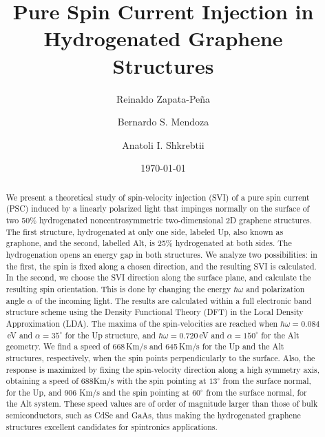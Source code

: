 \documentclass[floatfix,prb,aps,superscriptaddress,showpacs,11pt,preprint,letterpaper]{revtex4}
\begin{document}
\title{Pure Spin Current Injection in Hydrogenated Graphene Structures}
\author{Reinaldo Zapata-Pe\~na}
\author{Bernardo S. Mendoza}
\author{Anatoli I. Shkrebtii}

\date{\today}

\begin{abstract}
We present a theoretical study of spin-velocity injection (SVI) of a pure spin
current (PSC) induced by  a linearly polarized light that impinges normally on
the surface of  two 50\% hydrogenated noncentrosymmetric two-dimensional 2D
graphene structures. The first structure, hydrogenated at only one side,
labeled Up, also known as graphone, and the second, labelled Alt, is
25\% hydrogenated at both sides. The hydrogenation opens an energy gap in both
structures. We analyze two possibilities: in the first, the spin is fixed
along a chosen direction, and the resulting SVI is calculated.
In the second, we choose the SVI direction along
the surface plane, and calculate the resulting
spin orientation. This is done by changing the energy
$\hbar\omega$ and polarization angle $\alpha$  of the incoming  light. The
results are calculated within a full electronic band structure scheme using the
Density Functional Theory (DFT) in the Local Density Approximation (LDA). The
maxima of the spin-velocities are reached when $\hbar\omega=0.084$\,eV and
$\alpha=35^\circ$ for the Up structure, and $\hbar\omega=0.720$\,eV and
$\alpha=150^\circ$ for the Alt geometry. We find a speed of 668\,Km/s and
645\,Km/s for the Up and the Alt structures, respectively, when the spin points
perpendicularly to the surface. Also, the response is maximized by
fixing the spin-velocity direction 
along a high symmetry  axis, obtaining a speed of 688Km/s
with the spin pointing at $13^\circ$ from the surface normal, for the Up, 
and 906 Km/s and the spin pointing at $60^\circ$ from the surface normal, for
the Alt system. These speed values are  of order of magnitude larger than those of bulk semiconductors,
such as CdSe and GaAs, thus making the hydrogenated graphene structures
excellent candidates for spintronics applications. 
\end{abstract}

\maketitle
\end{document}
